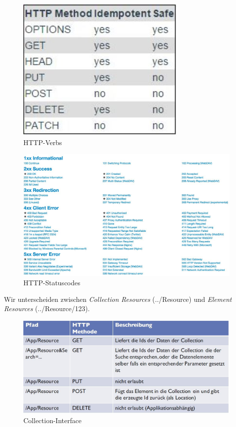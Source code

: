 \begin{figure}[h!]
\centering
\includegraphics[width=0.5\linewidth]{fig/http-verbs}
\caption{HTTP-Verbs}
\label{fig:http-verbs}
\end{figure}

\begin{figure}[h!]
\centering
\includegraphics[width=1\linewidth]{fig/http-statuscodes}
\caption{HTTP-Statuscodes}
\label{fig:http-statuscodes}
\end{figure}

Wir unterscheiden zwischen \emph{Collection Resources} (../Resource)  und \emph{Element Resources} (../Resource/123).

\begin{figure}[h!]
\centering
\includegraphics[width=0.7\linewidth]{fig/rest-collection-interface}
\caption{Collection-Interface}
\label{fig:rest-collection-interface}
\end{figure}

